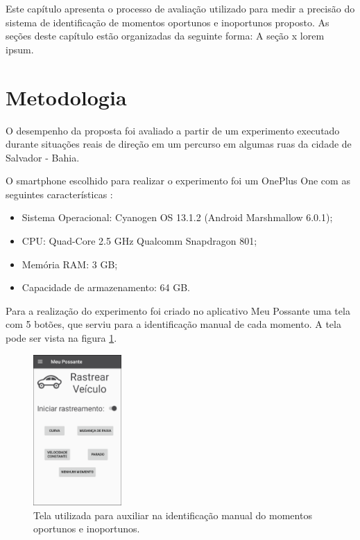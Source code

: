 \label{estudo-experimental}

Este capítulo apresenta o processo de avaliação utilizado para medir a precisão do
sistema de identificação de momentos oportunos e inoportunos proposto. As seções deste
capítulo estão organizadas da seguinte forma: A seção x lorem ipsum.

\section{Metodologia}
\label{metodologia}

O desempenho da proposta foi avaliado a partir de um experimento executado durante
situações reais de direção em um percurso em algumas ruas da cidade de Salvador -
Bahia.

O smartphone escolhido para realizar o experimento foi um OnePlus One com as seguintes características
\cite{oneplusone}:

\begin{itemize}
  \item Sistema Operacional: Cyanogen OS 13.1.2 (Android Marshmallow 6.0.1);
  \item CPU: Quad-Core 2.5 GHz Qualcomm Snapdragon 801;
  \item Memória RAM: 3 GB;
  \item Capacidade de armazenamento: 64 GB.
\end{itemize}

Para a realização do experimento foi criado no aplicativo Meu Possante uma tela com 5 botões, que serviu
para a identificação manual de cada momento. A tela pode ser vista na figura \ref{tela-experimento}.

\begin{figure}[h]
\centering
\includegraphics[width=0.3\textwidth]{images/tela-experimento.png}
\caption{Tela utilizada para auxiliar na identificação manual do momentos oportunos e inoportunos.}
\label{tela-experimento}
\end{figure}

